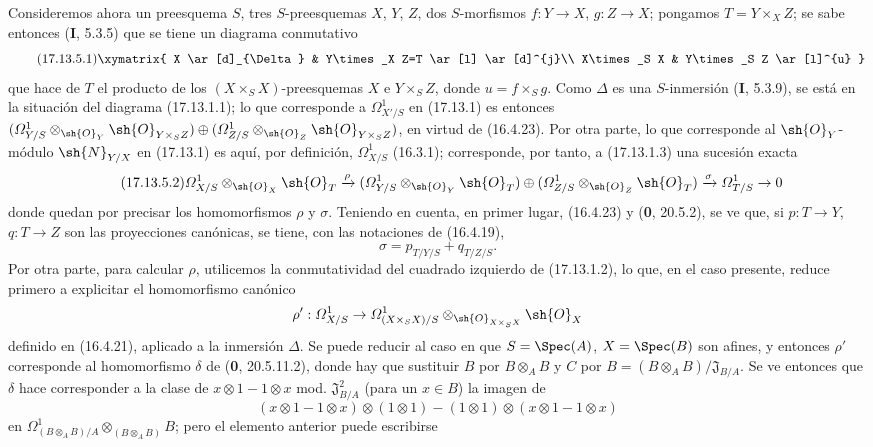 \begin{env}[17.13.5]
\label{IV.17.13.5}
Consideremos ahora un preesquema $S$, tres $S$-preesquemas $X$, $Y$, $Z$, dos $S$-morfismos $f:Y\to X$, $g:Z\to X$; pongamos $T=Y\times_XZ$; se sabe entonces (\textbf I, 5.3.5) que se tiene un diagrama conmutativo
\[
\label{IV.17.13.5.1}
\tag{17.13.5.1}
\xymatrix{
  X \ar[d]_{\Delta} & Y\times_X Z=T \ar[l] \ar[d]^{j}\\
  X\times_S X & Y\times_S Z \ar[l]^{u}
}
\]
que hace de $T$ el producto de los $(X\times_SX)$-preesquemas $X$ e $Y\times_SZ$, donde $u=f\times_Sg$. Como $\Delta$ es una $S$-inmersión (\textbf I, 5.3.9), se está en la situación del diagrama (17.13.1.1); lo que corresponde a $\varOmega^1_{X'/S}$ en (17.13.1) es entonces $(\varOmega^1_{Y/S}\otimes_{\sh{O}_Y}\sh{O}_{Y\times_SZ})\oplus(\varOmega^1_{Z/S}\otimes_{\sh{O}_Z}\sh{O}_{Y\times_SZ})$, en virtud de (16.4.23). Por otra parte, lo que corresponde al $\sh{O}_Y$-módulo $\sh{N}_{Y/X}$ en (17.13.1) es aquí, por definición, $\varOmega^1_{X/S}$ (16.3.1); corresponde, por tanto, a (17.13.1.3) una sucesión exacta
\[
\label{IV.17.13.5.2}
\tag{17.13.5.2}
\varOmega^1_{X/S}\otimes_{\sh{O}_X}\sh{O}_T\xrightarrow{\rho}
(\varOmega^1_{Y/S}\otimes_{\sh{O}_Y}\sh{O}_T)\oplus
(\varOmega^1_{Z/S}\otimes_{\sh{O}_Z}\sh{O}_T)
\xrightarrow{\sigma}\varOmega^1_{T/S}\to0
\]
donde quedan por precisar los homomorfismos $\rho$ y $\sigma$. Teniendo en cuenta, en primer lugar, (16.4.23) y (\textbf 0, 20.5.2), se ve que, si $p:T\to Y$, $q:T\to Z$ son las proyecciones canónicas, se tiene, con las notaciones de (16.4.19),
\[
\label{IV.17.13.5.3}
\tag{17.13.5.3}
\sigma=p_{T/Y/S}+q_{T/Z/S}.
\]
Por otra parte, para calcular $\rho$, utilicemos la conmutatividad del cuadrado izquierdo de (17.13.1.2), lo que, en el caso presente, reduce primero a explicitar el homomorfismo canónico
\[
\rho':\varOmega^1_{X/S}\to\varOmega^1_{(X\times_SX)/S}\otimes_{\sh{O}_{X\times_SX}}\sh{O}_X
\]
definido en (16.4.21), aplicado a la inmersión $\Delta$. Se puede reducir al caso en que $S=\Spec(A)$, $X=\Spec(B)$ son afines, y entonces $\rho'$ corresponde al homomorfismo $\delta$ de (\textbf 0, 20.5.11.2), donde hay que sustituir $B$ por $B\otimes_AB$ y $C$ por $B=(B\otimes_AB)/\mathfrak J_{B/A}$. Se ve entonces que $\delta$ hace corresponder a la clase de $x\otimes1-1\otimes x$ mod. $\mathfrak J_{B/A}^2$ (para un $x\in B$) la imagen de
\[
(x\otimes1-1\otimes x)\otimes(1\otimes1)-(1\otimes1)\otimes(x\otimes1-1\otimes x)
\]
en $\Omega^1_{(B\otimes_AB)/A}\otimes_{(B\otimes_AB)}B$; pero el elemento anterior puede escribirse
\[
\begin{split}

\end{split}\]
\end{env}
